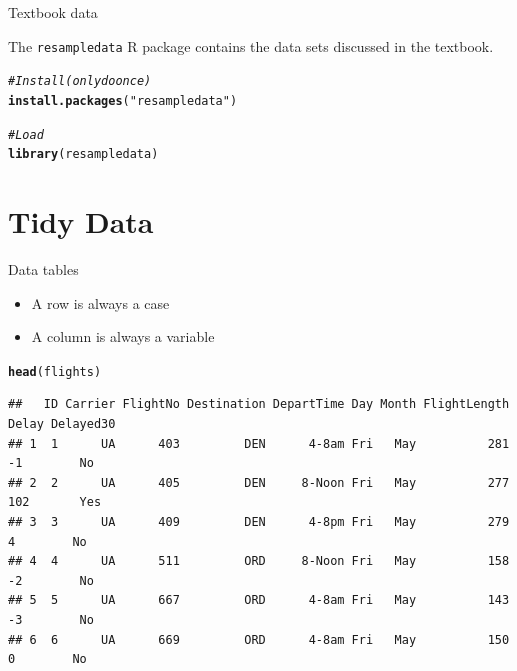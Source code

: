 \documentclass[10pt]{beamer}\usepackage[]{graphicx}\usepackage[]{color}
\makeatletter
\newcommand{\hlstr}[1]{\textcolor[rgb]{0.192,0.494,0.8}{#1}}%
\newcommand{\hlcom}[1]{\textcolor[rgb]{0.678,0.584,0.686}{\textit{#1}}}%
\newcommand{\hlstd}[1]{\textcolor[rgb]{0.345,0.345,0.345}{#1}}%
\newcommand{\hlkwd}[1]{\textcolor[rgb]{0.737,0.353,0.396}{\textbf{#1}}}%
\newenvironment{kframe}{%
 \def\at@end@of@kframe{}%
 \ifinner\ifhmode%
  \def\at@end@of@kframe{\end{minipage}}%
  \begin{minipage}{\columnwidth}%
 \fi\fi%
 \def\FrameCommand##1{\hskip\@totalleftmargin \hskip-\fboxsep
 \colorbox{shadecolor}{##1}\hskip-\fboxsep
     \hskip-\linewidth \hskip-\@totalleftmargin \hskip\columnwidth}%
 \MakeFramed {\advance\hsize-\width
   \@totalleftmargin\z@ \linewidth\hsize
   \@setminipage}}%
 {\par\unskip\endMakeFramed%
 \at@end@of@kframe}
\newenvironment{knitrout}{}{} %
\makeatother
\begin{document}
\begin{frame}[fragile]{Textbook data}

The \texttt{resampledata} R package contains the data sets discussed in the textbook.

\begin{knitrout}\small
{}\color{fgcolor}\begin{kframe}
\begin{alltt}
\hlcom{# Install (only do once)}
\hlkwd{install.packages}\hlstd{(}\hlstr{"resampledata"}\hlstd{)}

\hlcom{# Load}
\hlkwd{library}\hlstd{(resampledata)}
\end{alltt}
\end{kframe}
\end{knitrout}


\end{frame}

\section{Tidy Data}


\begin{frame}[fragile]{Data tables}

\begin{itemize}
\item A row is always a \alert{case}
\item A column is always a \alert{variable}
\end{itemize}




\begin{knitrout}\scriptsize
{}\color{fgcolor}\begin{kframe}
\begin{alltt}
\hlkwd{head}\hlstd{(flights)}
\end{alltt}
\begin{verbatim}
##   ID Carrier FlightNo Destination DepartTime Day Month FlightLength Delay Delayed30
## 1  1      UA      403         DEN      4-8am Fri   May          281    -1        No
## 2  2      UA      405         DEN     8-Noon Fri   May          277   102       Yes
## 3  3      UA      409         DEN      4-8pm Fri   May          279     4        No
## 4  4      UA      511         ORD     8-Noon Fri   May          158    -2        No
## 5  5      UA      667         ORD      4-8am Fri   May          143    -3        No
## 6  6      UA      669         ORD      4-8am Fri   May          150     0        No
\end{verbatim}
\end{kframe}
\end{knitrout}

\end{frame}
\end{document}
